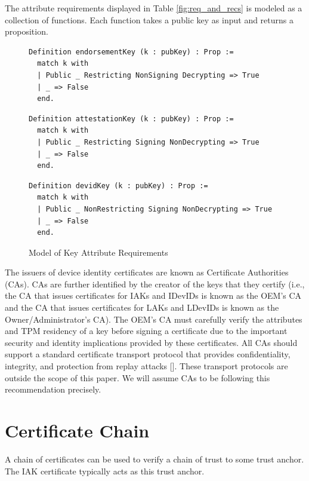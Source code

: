 The attribute requirements displayed in Table \ref{fig:req_and_recs} is modeled as a collection of functions. Each function takes a public key as input and returns a proposition.

\begin{figure}[h]
\begin{lstlisting}[language=Coq]
Definition endorsementKey (k : pubKey) : Prop :=
  match k with
  | Public _ Restricting NonSigning Decrypting => True
  | _ => False
  end.
\end{lstlisting}
\begin{lstlisting}[language=Coq]
Definition attestationKey (k : pubKey) : Prop :=
  match k with
  | Public _ Restricting Signing NonDecrypting => True
  | _ => False
  end.
\end{lstlisting}
\begin{lstlisting}[language=Coq]
Definition devidKey (k : pubKey) : Prop :=
  match k with
  | Public _ NonRestricting Signing NonDecrypting => True
  | _ => False
  end.
\end{lstlisting}
\caption{Model of Key Attribute Requirements}
\end{figure}

The issuers of device identity certificates are known as Certificate Authorities (CAs). CAs are further identified by the creator of the keys that they certify (i.e., the CA that issues certificates for IAKs and IDevIDs is known as the OEM's CA and the CA that issues certificates for LAKs and LDevIDs is known as the Owner/Administrator's CA). 
The OEM's CA must carefully verify the attributes and TPM residency of a key before signing a certificate due to the important security and identity implications provided by these certificates. 
All CAs should support a standard certificate transport protocol that provides confidentiality, integrity, and protection from replay attacks [\cite{DevIDSpec-TCG}]. These transport protocols are outside the scope of this paper. We will assume CAs to be following this recommendation precisely.


\section{Certificate Chain}

A chain of certificates can be used to verify a chain of trust to some trust anchor. The IAK certificate typically acts as this trust anchor.



